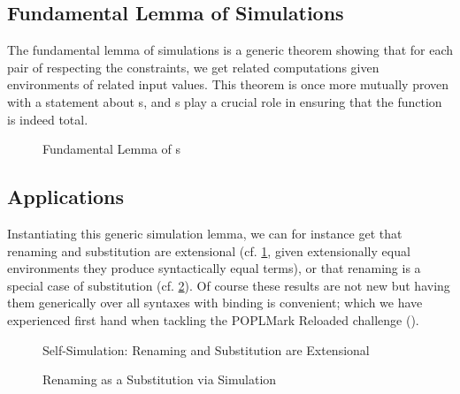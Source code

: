 
\subsection{Fundamental Lemma of Simulations}

The fundamental lemma of simulations is a generic theorem showing that for
each pair of  respecting the  constraints, we
get related computations given environments of related input values. This
theorem is once more mutually proven with a statement about s,
and s play a crucial role in ensuring that the function is indeed total.

\begin{figure}[h]
\caption{Fundamental Lemma of s}
\end{figure}

\subsection{Applications}

Instantiating this generic simulation lemma, we can for instance get
that renaming and substitution are extensional (cf. \cref{fig:genrensubext},
given extensionally equal environments they produce syntactically equal terms),
or that renaming is a special case of substitution (cf. \cref{fig:genrensub}).
Of course these results are not new but having them generically over all syntaxes
with binding is convenient; which we have experienced first hand when tackling the
POPLMark Reloaded challenge (\citeyear{poplmark2}).

\begin{figure}[h]
\caption{Self-Simulation: Renaming and Substitution are Extensional\label{fig:genrensubext}}
\end{figure}

\begin{figure}[h]
\caption{Renaming as a Substitution via Simulation\label{fig:genrensub}}
\end{figure}

